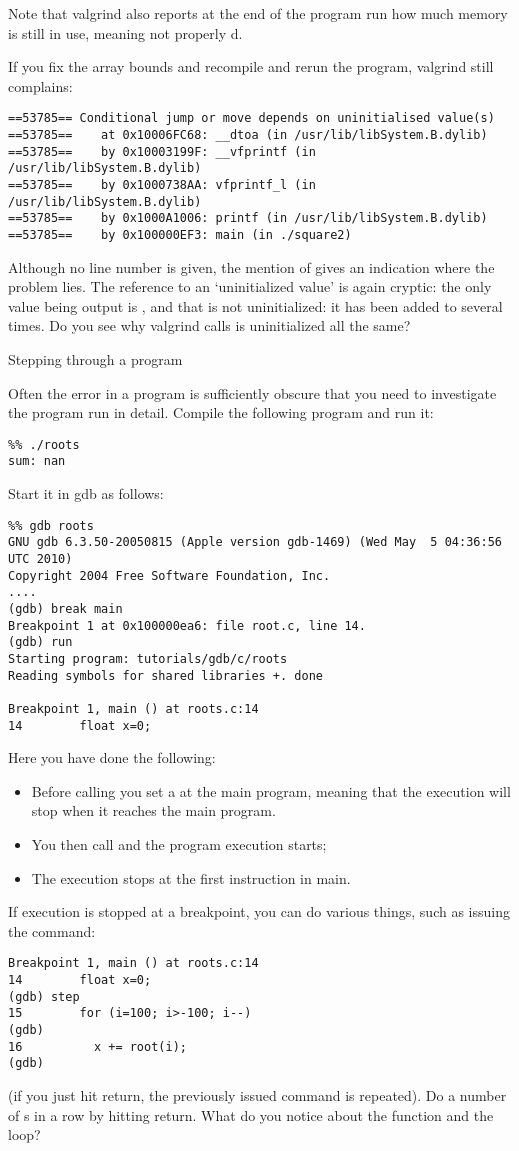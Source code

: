 Note that valgrind also reports at the end of the program run how much
memory is still in use, meaning not properly d.

If you fix the array bounds and recompile and rerun the program,
valgrind still complains:
{\small
\begin{verbatim}
==53785== Conditional jump or move depends on uninitialised value(s)
==53785==    at 0x10006FC68: __dtoa (in /usr/lib/libSystem.B.dylib)
==53785==    by 0x10003199F: __vfprintf (in /usr/lib/libSystem.B.dylib)
==53785==    by 0x1000738AA: vfprintf_l (in /usr/lib/libSystem.B.dylib)
==53785==    by 0x1000A1006: printf (in /usr/lib/libSystem.B.dylib)
==53785==    by 0x100000EF3: main (in ./square2)
\end{verbatim}
}
Although no line number is given, the mention of  gives an
indication where the problem lies.
The reference to an `uninitialized value' is again cryptic: the only
value being output is , and that is not uninitialized: it has
been added to several times. Do you see why valgrind calls is
uninitialized all the same?


 {Stepping through a program}

Often the error in a program is sufficiently obscure that you need to
investigate the program run in detail. Compile the following program
%
%
and run it:
\begin{verbatim}
%% ./roots
sum: nan
\end{verbatim}
Start it in gdb as follows:
\begin{verbatim}
%% gdb roots
GNU gdb 6.3.50-20050815 (Apple version gdb-1469) (Wed May  5 04:36:56 UTC 2010)
Copyright 2004 Free Software Foundation, Inc.
....
(gdb) break main
Breakpoint 1 at 0x100000ea6: file root.c, line 14.
(gdb) run
Starting program: tutorials/gdb/c/roots
Reading symbols for shared libraries +. done

Breakpoint 1, main () at roots.c:14
14        float x=0;
\end{verbatim}
Here you have done the following:
\begin{itemize}
\item Before calling  you set a  at the
  main program, meaning that the execution will stop when it reaches
  the main program.
\item You then call  and the program execution starts;
\item The execution stops at the first instruction in main.
\end{itemize}
If execution is stopped at a breakpoint, you can do various things,
such as issuing the  command:
\begin{verbatim}
Breakpoint 1, main () at roots.c:14
14        float x=0;
(gdb) step
15        for (i=100; i>-100; i--)
(gdb) 
16          x += root(i);
(gdb) 
\end{verbatim}
(if you just hit return, the previously issued command is
repeated). Do a number of s in a row by hitting return. What
do you notice about the function and the loop?

